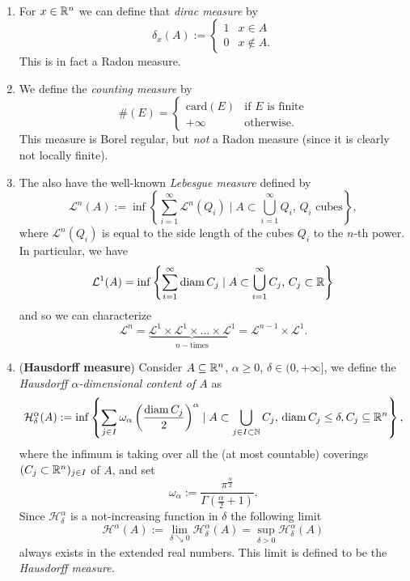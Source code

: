 \begin{examples}~
\begin{enumerate}[(1)]
\item For $x \in \mathbb{R}^n$ we can define that \emph{dirac measure} by  
\[
\delta_x(A) := 
\begin{cases}
1 & x \in A
\\
0 & x \not\in A.
\end{cases}
\]
This is in fact a Radon measure.
\item We define the \emph{counting measure} by
\[
\# (E) = 
\begin{cases}
\text{card}(E) & \text{if $E$ is finite}
\\
+\infty & \text{otherwise}.
\end{cases}
\]
This measure is Borel regular, but \emph{not} a Radon measure (since it is
clearly not locally finite).
\item The also have the well-known \emph{Lebesgue measure} defined by
\[
\mathcal{L}^n(A) := \inf \left\{\sum_{i=1}^\infty \mathcal{L}^n(Q_i) \mid A
\subset \bigcup_{i=1}^\infty Q_i,\, Q_i \text{ cubes}\right\},
\]
where $\mathcal{L}^n(Q_i)$ is equal to the side length of the cubes $Q_i$ to the
$n$-th power. In particular, we have
\[
\mathcal{L}^1(A) = \inf \left\{ \sum_{i=1}^\infty  \operatorname{diam} C_j \mid A
\subset \bigcup_{i=1}^\infty C_j, \, C_j \subset \mathbb{R} \right\}
\]
and so we can characterize
\[
\mathcal{L}^n = \underbrace{\mathcal{L}^1\times\mathcal{L}^1 \times \dots \times
\mathcal{L}^1}_{n-\text{times}} = \mathcal{L}^{n-1} \times \mathcal{L}^1.
\]
\item (\textbf{Hausdorff measure}) Consider $A \subseteq \mathbb{R}^n$, $\alpha \geq 0$, $\delta \in (0,+\infty]$, we
define the \emph{Hausdorff $\alpha$-dimensional content of $A$} as
\[
\mathcal{H}^\alpha_\delta(A) := \inf\left\{ \sum_{j\in I} \omega_\alpha
\left(\frac{\operatorname{diam} C_j}{2}\right)^\alpha \mid A \subset \bigcup_{j\in I \subset \mathbb{N}} C_j, \, \operatorname{diam}
C_j \leq \delta, C_j \subseteq \mathbb{R}^n \right\},
\]
where the infimum is taking over all the (at most countable) coverings $(C_j \subset
\mathbb{R}^n)_{j\in I}$ of $A$, and set $$\omega_\alpha :=
\frac{\pi^{\frac{\alpha}{2}}}{\Gamma\left(\frac{\alpha}{2}+1\right)}.$$ Since
$\mathcal{H}^\alpha_\delta$ is a not-increasing function in $\delta$ the
following limit
\[
\mathcal{H}^\alpha(A) := \lim_{\delta \searrow 0} \mathcal{H}^\alpha_\delta (A) =
\sup_{\delta > 0} \mathcal{H}^\alpha_\delta(A)
\]
always exists in the extended real numbers. This limit is defined to be the
\emph{Hausdorff measure}.
\end{enumerate}
\end{examples}

